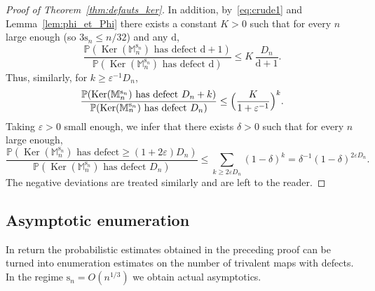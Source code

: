 \documentclass[JEP,XML,SOM,Unicode,NoFloatCountersInSection,NoEqCountersInSection]{cedram}
\theoremstyle{plain}
\theoremstyle{definition}
\theoremstyle{remark}
\renewcommand{\P}{\mathbb{P}}
\newcommand{\Mapb}{\mathbb{M}}
\newcommand{\defect}{\mathrm{d}}
\newcommand{\spar}{\mathrm{s}}
\DeclareMathOperator{\Ker}{Ker}
\begin{document}
\begin{proof}[Proof of Theorem~\ref{thm:defauts_ker}]
In addition, by~\eqref{eq:crude1} and Lemma~\ref{lem:phi_et_Phi} there exists a constant $K>0$ such that for every $n$ large enough (so \eg $3\spar_n \le n/32$) and any $\defect$,
\[
\frac{\P(\Ker(\Mapb_n^{\spar_n}) \textrm{ has defect } \defect+1)}{\P(\Ker(\Mapb_n^{\spar_n}) \textrm{ has defect } \defect)}
\le K\, \frac{D_n}{\defect+1}.
\]
Thus, similarly, for $k \ge \varepsilon^{-1} D_n$,
\[
\frac{\P(\Ker(\Mapb_n^{\spar_n}) \textrm{ has defect } D_n+k)}{\P(\Ker(\Mapb_n^{\spar_n}) \textrm{ has defect } D_n)}
\le \Bigl(\frac{K}{1+\varepsilon^{-1}}\Bigr)^k.
\]
Taking $\varepsilon>0$ small enough, we infer that there exists $\delta > 0$ such that for every $n$ large enough,
\[
\frac{\P(\Ker(\Mapb_n^{\spar_n}) \textrm{ has defect} \ge (1+2\varepsilon) D_n)}{\P(\Ker(\Mapb_n^{\spar_n}) \textrm{ has defect } D_n)}
\le \sum_{k \ge 2\varepsilon D_n} (1-\delta)^k = \delta^{-1} (1-\delta)^{2\varepsilon D_n}.
\]
The negative deviations are treated similarly and are left to the reader.
\end{proof}

\subsection{Asymptotic enumeration}
\label{ssec:asymp_enum}
In return the probabilistic estimates obtained in the preceding proof can be turned into enumeration estimates on the number of trivalent maps with defects. In the regime $\spar_{n} = O(n^{1/3})$ we obtain actual asymptotics.
\end{document}
